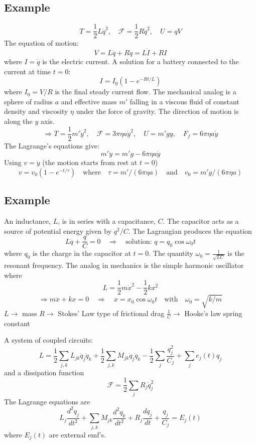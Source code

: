 \documentclass[12pt]{article}
\begin{document}
	\subsection*{Example}
	$$ T = \frac{1}{2} L \dot{q}^2, \quad \mathcal{F} = \frac{1}{2} R \dot{q}^2, \quad U = qV $$
	The equation of motion:
	$$ V = L\ddot{q} + R\dot{q} = L\dot{I} + RI $$
	where $I = \dot{q}$ is the electric current.
	A solution for a battery connected to the current at time $t=0$:
	$$ I = I_0(1-e^{-Rt/L}) $$
	where $I_0 = V/R$ is the final steady current flow.
	The mechanical analog is a sphere of radius $a$ and effective mass $m'$ falling in a viscous fluid of constant density and viscosity $\eta$ under the force of gravity. The direction of motion is along the $y$ axis.
	$$ \Rightarrow T = \frac{1}{2}m'\dot{y}^2, \quad \mathcal{F} = 3\pi\eta a \dot{y}^2, \quad U = m'gy, \quad F_f = 6\pi\eta a \dot{y} $$
	The Lagrange's equations give:
	$$ m'\ddot{y} = m'g - 6\pi\eta a \dot{y} $$
	Using $v = \dot{y}$ (the motion starts from rest at $t=0$)
	$$ v = v_0(1-e^{-t/\tau}) \quad \text{where} \quad \tau = m'/(6\pi\eta a) \quad \text{and} \quad v_0 = m'g/(6\pi\eta a) $$
	
	\subsection*{Example}
	An inductance, $L$, is in series with a capacitance, $C$.
	The capacitor acts as a source of potential energy given by $q^2/C$.
	The Lagrangian produces the equation
	$$ L\ddot{q} + \frac{q}{C} = 0 \quad \Rightarrow \quad \text{solution: } q=q_0 \cos\omega_0 t $$
	where $q_0$ is the charge in the capacitor at $t=0$.
	The quantity $\omega_0 = \frac{1}{\sqrt{LC}}$ is the resonant frequency.
	The analog in mechanics is the simple harmonic oscillator where
	$$ L = \frac{1}{2}m\dot{x}^2 - \frac{1}{2}kx^2 $$
	$$ \Rightarrow m\ddot{x} + kx = 0 \quad \Rightarrow \quad x = x_0 \cos\omega_0 t \quad \text{with} \quad \omega_0 = \sqrt{k/m} $$
	$L \to$ mass
	$R \to$ Stokes' Law type of frictional drag
	$\frac{1}{C} \to$ Hooke's law spring constant
	
	A system of coupled circuits:
	$$ L = \frac{1}{2}\sum_{j,k} L_{jk} \dot{q}_j \dot{q}_k + \frac{1}{2}\sum_{j,k} M_{jk} \dot{q}_j \dot{q}_k - \frac{1}{2}\sum_j \frac{q_j^2}{C_j} + \sum_j e_j(t)q_j $$
	and a dissipation function
	$$ \mathcal{F} = \frac{1}{2}\sum_j R_j \dot{q}_j^2 $$
	The Lagrange equations are
	$$ L_j \frac{d^2q_j}{dt^2} + \sum_{j,k} M_{jk} \frac{d^2q_k}{dt^2} + R_j \frac{dq_j}{dt} + \frac{q_j}{C_j} = E_j(t) $$
	where $E_j(t)$ are external emf's.
	
\end{document}
